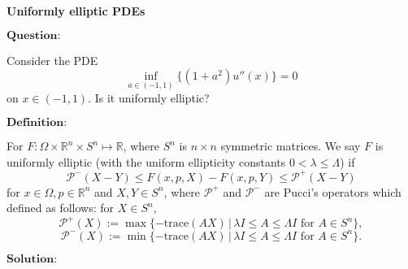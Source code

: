 \documentclass[12pt,a4paper]{ctexart}
\begin{document}
\begin{center}
\textbf{Uniformly elliptic PDEs}
\end{center}

$\textbf{Question:}$

Consider the PDE
\begin{equation}
    \inf_{a \in (-1, 1)} \{(1 + a^2) u''(x)\} = 0
\end{equation}
on $x \in (-1, 1)$. Is it uniformly elliptic?

\vspace{8pt}

$\textbf{Definition:}$

For $F: \Omega \times \mathbb{R}^{n} \times S^{n} \mapsto \mathbb{R}$, where $S^{n}$ is $n \times n$ symmetric matrices. We say $F$
is uniformly elliptic (with the uniform ellipticity constants $ 0 < \lambda \leq \Lambda$) if
\begin{equation}
    \mathcal{P}^{-} (X - Y) \leq F(x, p, X) - F(x, p, Y) \leq \mathcal{P}^{+} (X - Y)
\end{equation}
for $x \in \Omega, p \in \mathbb{R}^{n}$ and $X, Y \in S^{n}$, where $\mathcal{P}^{+}$ and $\mathcal{P}^{-}$ are Pucci's operators which defined as follows: for $X \in S^{n}$,
\begin{equation*}
    \mathcal{P}^{+}(X) := \max \{- \text{trace}(AX) \,| \, \lambda I \leq A \leq \Lambda I \,\, \text{for} \,\, A \in S^{n}\},
\end{equation*}
\begin{equation*}
    \mathcal{P}^{-}(X) := \min \{- \text{trace}(AX) \,| \, \lambda I \leq A \leq \Lambda I \,\, \text{for} \,\, A \in S^{n}\}.
\end{equation*}

\vspace{8pt}

$\textbf{Solution:}$
\end{document}
